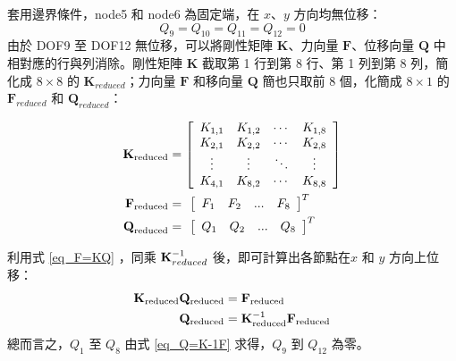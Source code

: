 \documentclass[12pt]{article}
\numberwithin{figure}{section}
\numberwithin{table}{section}
\numberwithin{equation}{section}
\begin{document}
\begin{CJK}{UTF8}{bkai}
\begin{description}
		套用邊界條件，node5 和 node6 為固定端，在 $x$、$y$ 方向均無位移：
		\begin{equation}
		\label{eq_boundaryConditions}
		Q_9 = Q_{10} = Q_{11} = Q_{12} = 0
		\end{equation}
		由於 DOF9 至 DOF12 無位移，可以將剛性矩陣 $\textbf{K}$、力向量 $\textbf{F}$、位移向量 $\textbf{Q}$ 中相對應的行與列消除。剛性矩陣 $\textbf{K}$ 截取第 1 行到第 8 行、第 1 列到第 8 列，簡化成 $8\times8$ 的 $\textbf{K}_{reduced}$；力向量 $\textbf{F}$ 和移向量 $\textbf{Q}$ 簡也只取前 8 個，化簡成 $8\times1$ 的 $\textbf{F}_{reduced}$ 和 $\textbf{Q}_{reduced}$：

		\begin{align}
		\label{eq_kReaction}
			{\bf K}_{\mathrm{reduced}}&=
			\left[
			\begin{array}{cccc}
			K_{1,1} & K_{1,2} & \cdots &K_{1,8}\\
			K_{2,1} & K_{2,2} & \cdots &K_{2,8}\\
			\vdots & \vdots &  \ddots&\vdots\\
			K_{4,1} & K_{8,2} & \cdots &K_{8,8}\\
			\end{array}
			\right]\\
		\label{eq_reducedForceVector}
			\textbf{F}_{\mathrm{reduced}}&= \:\,
			\left[
			\begin{array}{cccc}
			F_1 & F_2 & ... & F_{8}
			\end{array}
			\right]^T\\
		\label{eq_reducedDisplacementVector}
			\textbf{Q}_{\mathrm{reduced}}&= \:\,
			\left[
			\begin{array}{cccc}
			Q_1 & Q_2 & ... & Q_{8}
			\end{array}
			\right]^T
		\end{align}
		
		
		利用式 \ref{eq_F=KQ} ，同乘 ${\bf K}_{reduced}^{-1}$ 後，即可計算出各節點在$x$ 和 $y$ 方向上位移：
		\begin{align}
			\notag
 			{\bf K}_{\mathrm{reduced}}{\bf Q}_{\mathrm{reduced}} &= {\bf F}_{\mathrm{reduced}}\\
			\label{eq_Q=K-1F}
 			{\bf Q}_{\mathrm{reduced}} &= {\bf K}_{\mathrm{reduced}}^{-1} {\bf F}_{\mathrm{reduced}}
		\end{align}
		總而言之，$Q_1$ 至 $Q_8$ 由式 \ref{eq_Q=K-1F} 求得，$Q_9$ 到 $Q_{12}$ 為零。\\


\end{description}
\end{CJK}
\end{document}
